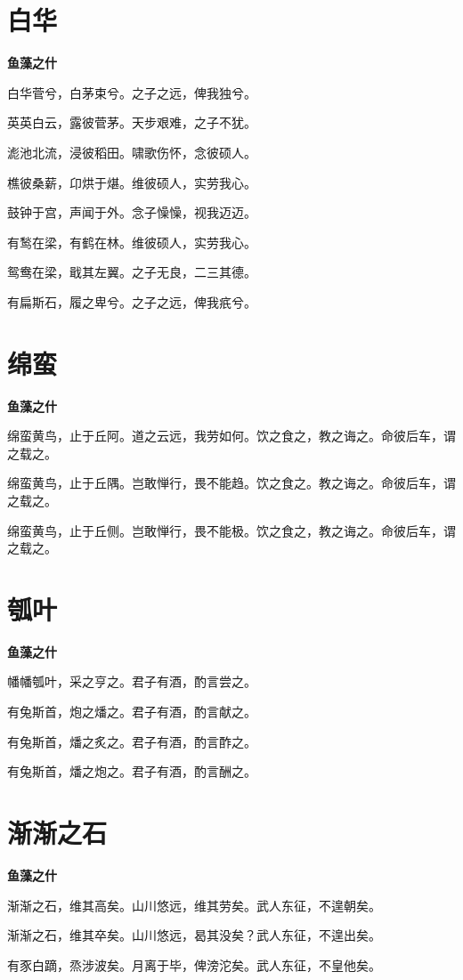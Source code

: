 \documentclass[12pt,a4paper]{ctexbook}
\begin{document}
\section{白华}
\textbf{鱼藻之什}\par\vspace{0.5em}
白华菅兮，白茅束兮。之子之远，俾我独兮。\par
英英白云，露彼菅茅。天步艰难，之子不犹。\par
滮池北流，浸彼稻田。啸歌伤怀，念彼硕人。\par
樵彼桑薪，卬烘于煁。维彼硕人，实劳我心。\par
鼓钟于宫，声闻于外。念子懆懆，视我迈迈。\par
有鹙在梁，有鹤在林。维彼硕人，实劳我心。\par
鸳鸯在梁，戢其左翼。之子无良，二三其德。\par
有扁斯石，履之卑兮。之子之远，俾我疧兮。\par

\section{绵蛮}
\textbf{鱼藻之什}\par\vspace{0.5em}
绵蛮黄鸟，止于丘阿。道之云远，我劳如何。饮之食之，教之诲之。命彼后车，谓之载之。\par
绵蛮黄鸟，止于丘隅。岂敢惮行，畏不能趋。饮之食之。教之诲之。命彼后车，谓之载之。\par
绵蛮黄鸟，止于丘侧。岂敢惮行，畏不能极。饮之食之，教之诲之。命彼后车，谓之载之。\par

\section{瓠叶}
\textbf{鱼藻之什}\par\vspace{0.5em}
幡幡瓠叶，采之亨之。君子有酒，酌言尝之。\par
有兔斯首，炮之燔之。君子有酒，酌言献之。\par
有兔斯首，燔之炙之。君子有酒，酌言酢之。\par
有兔斯首，燔之炮之。君子有酒，酌言酬之。\par

\section{渐渐之石}
\textbf{鱼藻之什}\par\vspace{0.5em}
渐渐之石，维其高矣。山川悠远，维其劳矣。武人东征，不遑朝矣。\par
渐渐之石，维其卒矣。山川悠远，曷其没矣？武人东征，不遑出矣。\par
有豕白蹢，烝涉波矣。月离于毕，俾滂沱矣。武人东征，不皇他矣。\par
\end{document}

